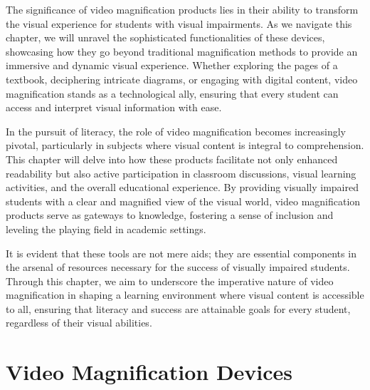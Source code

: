 \documentclass[14pt,letterpaper,twoside]{extreport}
\begin{document}
The significance of video magnification products lies in their ability to transform the visual experience for students with visual impairments. As we navigate this chapter, we will unravel the sophisticated functionalities of these devices, showcasing how they go beyond traditional magnification methods to provide an immersive and dynamic visual experience. Whether exploring the pages of a textbook, deciphering intricate diagrams, or engaging with digital content, video magnification stands as a technological ally, ensuring that every student can access and interpret visual information with ease.

In the pursuit of literacy, the role of video magnification becomes increasingly pivotal, particularly in subjects where visual content is integral to comprehension. This chapter will delve into how these products facilitate not only enhanced readability but also active participation in classroom discussions, visual learning activities, and the overall educational experience. By providing visually impaired students with a clear and magnified view of the visual world, video magnification products serve as gateways to knowledge, fostering a sense of inclusion and leveling the playing field in academic settings.

It is evident that these tools are not mere aids; they are essential components in the arsenal of resources necessary for the success of visually impaired students. Through this chapter, we aim to underscore the imperative nature of video magnification in shaping a learning environment where visual content is accessible to all, ensuring that literacy and success are attainable goals for every student, regardless of their visual abilities.

\hypertarget{video-magnification-devices}{%
	\section{Video Magnification
	  Devices}\label{video-magnification-devices}}
\end{document}
